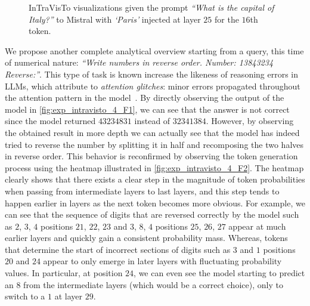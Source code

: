 \begin{figure}[t!]
    \centering
    \caption[InTraVisTo visualizations given the prompt \emph{``What is the capital of Italy?''} to Mistral with injections.]{InTraVisTo visualizations given the prompt \emph{``What is the capital of Italy?''} to Mistral with \emph{`Paris'} injected at layer $25$ for the $16$th token.}
    \label{fig:exp_intravisto_4_E}
\end{figure}

We propose another complete analytical overview starting from a query, this time of numerical nature: \emph{``Write numbers in reverse order. Number: 13843234 Reverse:''}.
This type of task is known increase the likeness of reasoning errors in LLMs, which  attribute to \emph{attention glitches}: minor errors propagated throughout the attention pattern in the model~\cite{liu2023}.
By directly observing the output of the model in \cref{fig:exp_intravisto_4_F1}, we can see that the answer is not correct since the model returned $43234831$ instead of $32341384$.
However, by observing the obtained result in more depth we can actually see that the model has indeed tried to reverse the number by splitting it in half and recomposing the two halves in reverse order.
This behavior is reconfirmed by observing the token generation process using the heatmap illustrated in \cref{fig:exp_intravisto_4_F2}.
The heatmap clearly shows that there exists a clear step in the magnitude of token probabilities when passing from intermediate layers to last layers, and this step  tends to happen earlier in layers as the next token becomes more obvious.
For example, we can see that the sequence of digits that are reversed correctly by the model such as $2$, $3$, $4$  positions $21$, $22$, $23$ and $3$, $8$, $4$  positions $25$, $26$, $27$ appear at much earlier layers and quickly gain a consistent probability mass.
Whereas, tokens that determine the start of incorrect sections of digits such as $3$ and $1$  positions $20$ and $24$ appear to only emerge in later layers with fluctuating probability values.
In particular,  at position $24$, we can even see the model starting to predict an $8$ from the intermediate layers (which would be a correct choice), only to switch to a $1$ at layer $29$.

